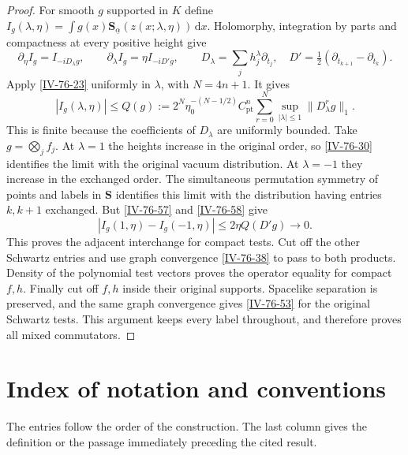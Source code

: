 \documentclass[11pt,letterpaper,reqno]{amsart}
\theoremstyle{definition}
\theoremstyle{remark}
\begin{document}
\begin{proof}
For smooth $g$ supported in $K$ define
$I_g(\lambda,\eta)=\int g(x)
\mathbf S_{\underline\alpha}(z(x;\lambda,\eta))\,\mathrm{d}x$.
Holomorphy, integration by parts and compactness at every
positive height give
\begin{equation}\label{IV-76-57}
 \partial_\eta I_g=I_{-iD_\lambda g},\qquad
 \partial_\lambda I_g=\eta I_{-iD'g},\qquad
 D_\lambda=\sum_jh_j^\lambda\partial_{t_j},\quad
 D'=\tfrac12(\partial_{t_{k+1}}-\partial_{t_k}).
\end{equation}
Apply \cref{IV-76-23} uniformly in $\lambda$, with
$N=4n+1$. It gives
\begin{equation}\label{IV-76-58}
 |I_g(\lambda,\eta)|\le Q(g):=
 2^N\eta_0^{-(N-1/2)}C_{\mathrm{pt}}^n
       \sum_{r=0}^N\sup_{|\lambda|\le1}\|D_\lambda^rg\|_1.
\end{equation}
This is finite because the coefficients of $D_\lambda$
are uniformly bounded.
Take $g=\bigotimes_jf_j$. At $\lambda=1$ the heights
increase in the original order, so \eqref{IV-76-30}
identifies the limit with the original vacuum distribution.
At $\lambda=-1$ they increase in the exchanged order.
The simultaneous permutation symmetry of points and
labels in $\mathbf S$ identifies this limit with the
distribution having entries $k,k+1$ exchanged.
But \eqref{IV-76-57} and \eqref{IV-76-58} give
\[
 |I_g(1,\eta)-I_g(-1,\eta)|\le2\eta Q(D'g)\longrightarrow0.
\]
This proves the adjacent interchange for compact tests.
Cut off the other Schwartz entries and use graph convergence
\eqref{IV-76-38} to pass to both products. Density of the
polynomial test vectors proves the operator equality for
compact $f,h$. Finally cut off $f,h$ inside their original
supports. Spacelike separation is preserved, and the same
graph convergence gives \eqref{IV-76-53} for the original
Schwartz tests. This argument keeps every label throughout,
and therefore proves all mixed commutators.
\end{proof}

\section{Index of notation and conventions}
\label{app:qcd-notation}

The entries follow the order of the construction. The last column
gives the definition or the passage immediately preceding the cited result.
\end{document}
